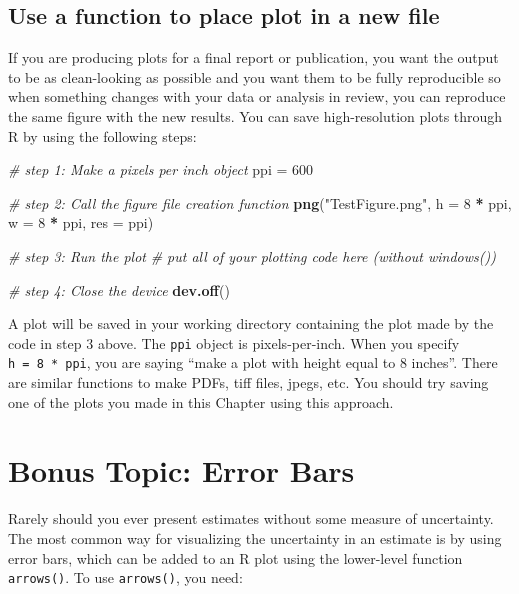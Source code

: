 \documentclass[]{book}
\newenvironment{Shaded}{\begin{snugshade}}{\end{snugshade}}
\newcommand{\KeywordTok}[1]{\textcolor[rgb]{0.13,0.29,0.53}{\textbf{#1}}}
\newcommand{\DataTypeTok}[1]{\textcolor[rgb]{0.13,0.29,0.53}{#1}}
\newcommand{\DecValTok}[1]{\textcolor[rgb]{0.00,0.00,0.81}{#1}}
\newcommand{\StringTok}[1]{\textcolor[rgb]{0.31,0.60,0.02}{#1}}
\newcommand{\CommentTok}[1]{\textcolor[rgb]{0.56,0.35,0.01}{\textit{#1}}}
\newcommand{\OperatorTok}[1]{\textcolor[rgb]{0.81,0.36,0.00}{\textbf{#1}}}
\newcommand{\NormalTok}[1]{#1}
\theoremstyle{definition}
\theoremstyle{definition}
\theoremstyle{definition}
\theoremstyle{remark}
\begin{document}
\subsection{Use a function to place plot in a new
file}\label{use-a-function-to-place-plot-in-a-new-file}

If you are producing plots for a final report or publication, you want
the output to be as clean-looking as possible and you want them to be
fully reproducible so when something changes with your data or analysis
in review, you can reproduce the same figure with the new results. You
can save high-resolution plots through R by using the following steps:

\begin{Shaded}
\begin{Highlighting}[]
\CommentTok{# step 1: Make a pixels per inch object}
\NormalTok{ppi =}\StringTok{ }\DecValTok{600}

\CommentTok{# step 2: Call the figure file creation function}
\KeywordTok{png}\NormalTok{(}\StringTok{"TestFigure.png"}\NormalTok{, }\DataTypeTok{h =} \DecValTok{8} \OperatorTok{*}\StringTok{ }\NormalTok{ppi, }\DataTypeTok{w =} \DecValTok{8} \OperatorTok{*}\StringTok{ }\NormalTok{ppi, }\DataTypeTok{res =}\NormalTok{ ppi)}

\CommentTok{# step 3: Run the plot }
\CommentTok{# put all of your plotting code here (without windows())}

\CommentTok{# step 4: Close the device}
\KeywordTok{dev.off}\NormalTok{()}
\end{Highlighting}
\end{Shaded}

A plot will be saved in your working directory containing the plot made
by the code in step 3 above. The \texttt{ppi} object is pixels-per-inch.
When you specify \texttt{h\ =\ 8\ *\ ppi}, you are saying ``make a plot
with height equal to 8 inches''. There are similar functions to make
PDFs, tiff files, jpegs, etc. You should try saving one of the plots you
made in this Chapter using this approach.

\section{Bonus Topic: Error Bars}\label{error-bars}

Rarely should you ever present estimates without some measure of
uncertainty. The most common way for visualizing the uncertainty in an
estimate is by using error bars, which can be added to an R plot using
the lower-level function \texttt{arrows()}. To use \texttt{arrows()},
you need:
\end{document}
